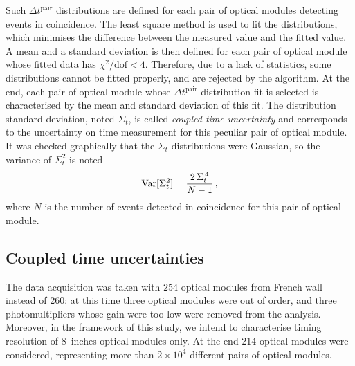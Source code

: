 Such  $\Delta t^{\text{pair}}$ distributions are defined for each pair of optical modules detecting events in coincidence.
The least square method is used to fit the distributions, which minimises the difference between the measured value and the fitted value.
A mean and a standard deviation is then defined for each pair of optical module whose fitted data has $\chi^{2}/\text{dof}<4$.
Therefore, due to a lack of statistics, some distributions cannot be fitted properly, and are rejected by the algorithm.
At the end, each pair of optical module whose $\Delta t^{\text{pair}}$ distribution fit is selected is characterised by the mean and standard deviation of this fit.
The distribution standard deviation, noted $\Sigma_{t}$, is called \emph{coupled time uncertainty} and corresponds to the uncertainty on time measurement for this peculiar pair of optical module.
It was checked graphically that the $\Sigma_{t}$ distributions were Gaussian, so the variance of $\Sigma_{t}^{2}$ is noted
\begin{equation}
  \mathrm{Var}[\Sigma_{t}^{2}] = \frac{2\,\Sigma_{t}^{\,4}}{N-1}\,,
  \label{eq:var_sigma_pair}
\end{equation}
where $N$ is the number of events detected in coincidence for this pair of optical module.

\subsection{Coupled time uncertainties}

The data acquisition was taken with $254$ optical modules from French wall instead of $260$: at this time three optical modules were out of order, and three photomultipliers whose gain were too low were removed from the analysis.
Moreover, in the framework of this study, we intend to characterise timing resolution of $8$~inches optical modules only.
At the end $214$ optical modules were considered, representing more than ${2\times10^{4}}$ different pairs of optical modules.

